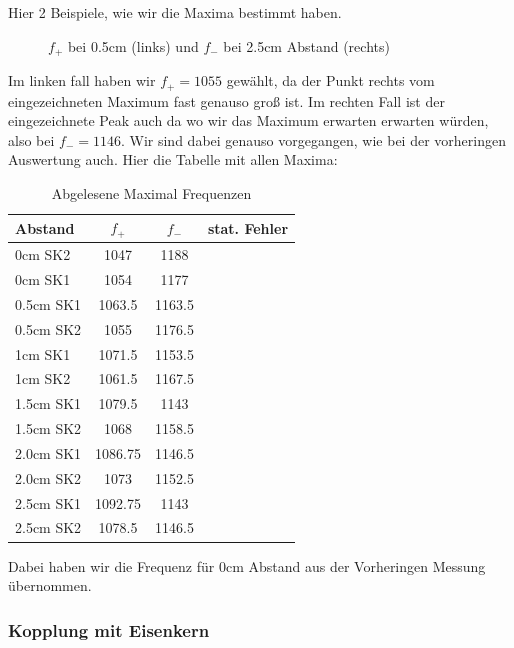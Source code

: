 \documentclass[twoside]{protokoll}
\begin{document}
 
Hier 2 Beispiele, wie wir die Maxima bestimmt haben.
\begin{figure}[H]
    \centering
    \caption{$f_+$ bei 0.5cm (links) und $f_-$ bei 2.5cm Abstand (rechts)}
\end{figure}
Im linken fall haben wir $f_+ = 1055$ gewählt, da der Punkt rechts vom eingezeichneten Maximum fast genauso groß ist.
Im rechten Fall ist der eingezeichnete Peak auch da wo wir das Maximum erwarten erwarten würden, also bei $f_- = 1146$.
Wir sind dabei genauso vorgegangen, wie bei der vorheringen Auswertung auch.
Hier die Tabelle mit allen Maxima:
\begin{table}[H]
        \centering
        \caption{Abgelesene Maximal Frequenzen}
        \begin{tabularx}{0.4\textwidth}{X c c c}
            \toprule
            \textbf{Abstand} & \textbf{$f_+$} & \textbf{$f_-$} & \textbf{stat. Fehler} \\
            \midrule
            0cm SK2 &  1047 & 1188 \\
            0cm SK1 &  1054 & 1177 \\
            0.5cm SK1 &  1063.5 & 1163.5 \\
            0.5cm SK2 &  1055 & 1176.5 \\
            1cm SK1 &  1071.5 & 1153.5 \\
            1cm SK2 &  1061.5 & 1167.5 \\
            1.5cm SK1 &  1079.5 & 1143 \\
            1.5cm SK2 &  1068 & 1158.5 \\
            2.0cm SK1 &  1086.75 & 1146.5 \\ %
            2.0cm SK2 &  1073 & 1152.5 \\
            2.5cm SK1 &  1092.75 & 1143 \\ %
            2.5cm SK2 &  1078.5 & 1146.5 \\
            \bottomrule
        \end{tabularx}
        \label{tab:mytable}
    \end{table}
Dabei haben wir die Frequenz für 0cm Abstand aus der Vorheringen Messung übernommen.


\subsubsection{Kopplung mit Eisenkern}
\end{document}
